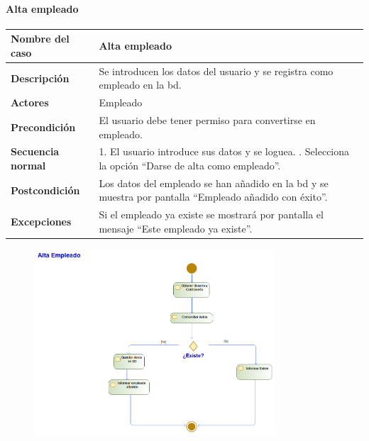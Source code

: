 \paragraph{Alta empleado}
\begin{table}[H]
    \centering
    \small
    \begin{tabularx}{0.8\textwidth}{|p{3.5cm}|X|}
        \hline
        \rowcolor{lightgray}
        \textbf{Nombre del caso}  & \textbf{Alta empleado}                                                                                         \\
        \hline
        \textbf{Descripción}      & Se introducen los datos del usuario y se registra como empleado en la \gls{bd}.                                \\
        \hline
        \textbf{Actores}          & Empleado                                                                                                       \\
        \hline
        \textbf{Precondición}     & El usuario debe tener permiso para convertirse en empleado.                                                    \\
        \hline
        \textbf{Secuencia normal} & 1. El usuario introduce sus datos y se loguea. \newline
        2. Selecciona la opción ``Darse de alta como empleado''.                                                                                   \\
        \hline
        \textbf{Postcondición}    & Los datos del empleado se han añadido en la \gls{bd} y se muestra por pantalla ``Empleado añadido con éxito''. \\
        \hline
        \textbf{Excepciones}      & Si el empleado ya existe se mostrará por pantalla el mensaje ``Este empleado ya existe''.                      \\
        \hline
    \end{tabularx}
\end{table}
\begin{figure}[H]
    \centering
    \includegraphics[width=0.8\textwidth]{Use_Cases/Alta_empleado.png}
\end{figure}
\newpage
